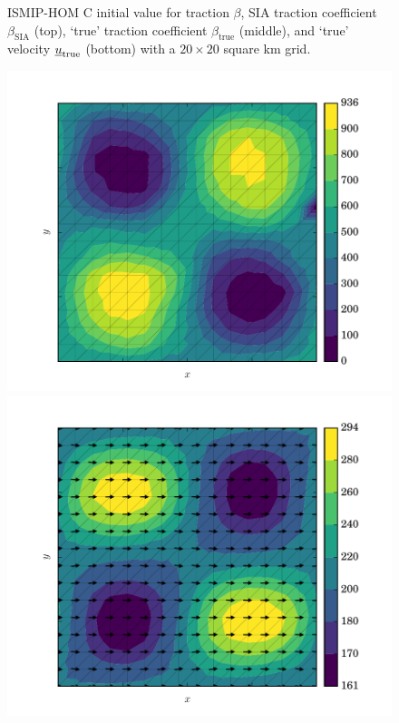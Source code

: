 \begin{figure}
  \caption[Inverse ISMIP-HOM `true' data fields]{ISMIP-HOM C initial value for traction $\beta$, SIA traction coefficient $\beta_{\text{SIA}}$ (top), `true' traction coefficient $\beta_{\text{true}}$ (middle), and `true' velocity $\underline{u}_{\text{true}}$ (bottom) with a $20 \times 20$ square km grid.}
  \label{inverse_ismip_true}
\end{figure}

\begin{figure}
  \centering
    \includegraphics[width=0.9\linewidth]{images/data_assimilation/ISMIP_HOM_C/TV/beta_opt.pdf}
    \includegraphics[width=0.9\linewidth]{images/data_assimilation/ISMIP_HOM_C/TV/U_opt.pdf}

\end{figure}

